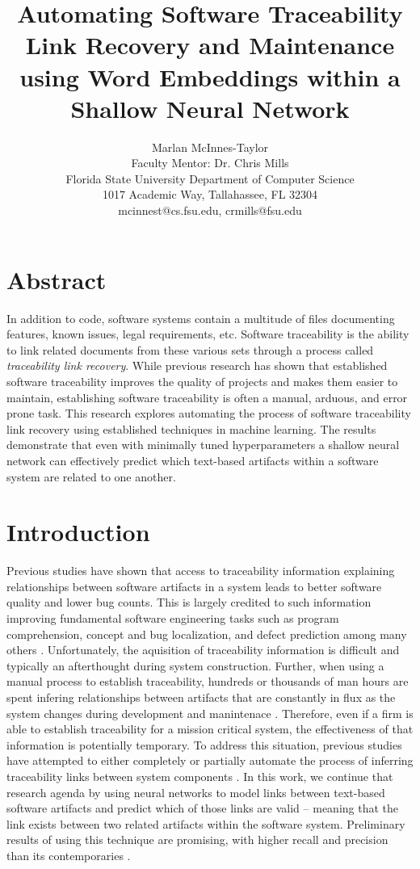 \documentclass{article}
\title{Automating Software Traceability Link Recovery and Maintenance using Word Embeddings within a Shallow Neural Network}
\author{Marlan McInnes-Taylor\\Faculty Mentor: Dr. Chris Mills\\Florida State University Department of Computer Science\\1017 Academic Way, Tallahassee, FL 32304\\mcinnest@cs.fsu.edu, crmills@fsu.edu}
\date{}
\begin{document}
\maketitle

\section{Abstract}
In addition to code, software systems contain a multitude of files documenting features, known issues, legal requirements, etc. Software traceability is the ability to link related documents from these various sets through a process called \textit{traceability link recovery}. While previous research has shown that established software traceability improves the quality of projects and makes them easier to maintain, establishing software traceability is often a manual, arduous, and error prone task. This research explores automating the process of software traceability link recovery using established techniques in machine learning. The results demonstrate that even with minimally tuned hyperparameters a shallow neural network can effectively predict which text-based artifacts within a software system are related to one another.

\section{Introduction}
    Previous studies have shown that access to traceability information explaining relationships between software artifacts in a system leads to better software quality and lower bug counts. This is largely credited to such information improving fundamental software engineering tasks such as program comprehension, concept and bug localization, and defect prediction among many others \cite{bouillon2013survey, mader2015developers, mader2016preventing}. Unfortunately, the aquisition of traceability information is difficult and typically an afterthought during system construction. Further, when using a manual process to establish traceability, hundreds or thousands of man hours are spent infering relationships between artifacts that are constantly in flux as the system changes during development and manintenace \cite{james1997automatic, weidenhaupt1998scenarios, antoniol2000traceability}. Therefore, even if a firm is able to establish traceability for a mission critical system, the effectiveness of that information is potentially temporary. To address this situation, previous studies have attempted to either completely or partially automate the process of inferring traceability links between system components \cite{borg2014recovering}. In this work, we continue that research agenda by using neural networks to model links between text-based software artifacts and predict which of those links are valid -- meaning that the link exists between two related artifacts within the software system. Preliminary results of using this technique are promising, with higher recall and precision than its contemporaries \cite{mills2018automatic, mills2019tracing}.
\end{document}
